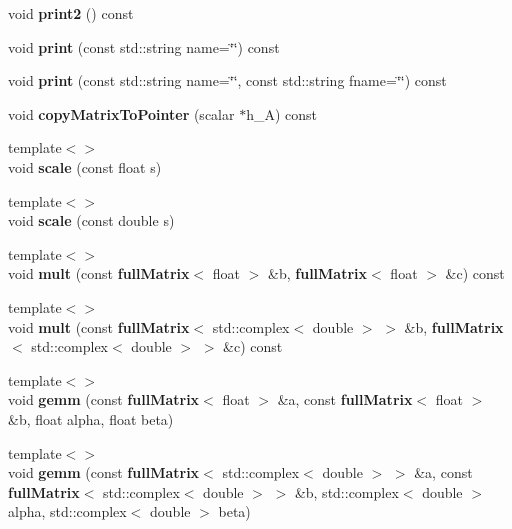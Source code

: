 \begin{DoxyCompactItemize}
\item 
void {\bfseries print2} () const \label{classfullMatrix_a62b8e0b92fa3c149fa6ba9988bcbed97}

\item 
void {\bfseries print} (const std\-::string name=\char`\"{}\char`\"{}) const \label{classfullMatrix_adfaa308571fcfa232a9a4b0c46eab453}

\item 
void {\bfseries print} (const std\-::string name=\char`\"{}\char`\"{}, const std\-::string fname=\char`\"{}\char`\"{}) const \label{classfullMatrix_a7a83c0b4db828cc61989ed7aa2c56c4c}

\item 
void {\bfseries copy\-Matrix\-To\-Pointer} (scalar $\ast$h\-\_\-\-A) const \label{classfullMatrix_a5294f88a7d8cb9cf2960257153f15776}

\item 
{\footnotesize template$<$$>$ }\\void {\bfseries scale} (const float s)\label{classfullMatrix_a29131c6c324a3f36444c0b41959b8ac9}

\item 
{\footnotesize template$<$$>$ }\\void {\bfseries scale} (const double s)\label{classfullMatrix_a263288bc530912102585b2384b3ef296}

\item 
{\footnotesize template$<$$>$ }\\void {\bfseries mult} (const {\bf full\-Matrix}$<$ float $>$ \&b, {\bf full\-Matrix}$<$ float $>$ \&c) const\label{classfullMatrix_abb98d8f13f95dc655b75c79ea19f6eaf}

\item 
{\footnotesize template$<$$>$ }\\void {\bfseries mult} (const {\bf full\-Matrix}$<$ std\-::complex$<$ double $>$ $>$ \&b, {\bf full\-Matrix}$<$ std\-::complex$<$ double $>$ $>$ \&c) const\label{classfullMatrix_afda3de318c1e48c43dc8d2d2dbaf6066}

\item 
{\footnotesize template$<$$>$ }\\void {\bfseries gemm} (const {\bf full\-Matrix}$<$ float $>$ \&a, const {\bf full\-Matrix}$<$ float $>$ \&b, float alpha, float beta)\label{classfullMatrix_a847a1302692b5b201d7560c9fae44061}

\item 
{\footnotesize template$<$$>$ }\\void {\bfseries gemm} (const {\bf full\-Matrix}$<$ std\-::complex$<$ double $>$ $>$ \&a, const {\bf full\-Matrix}$<$ std\-::complex$<$ double $>$ $>$ \&b, std\-::complex$<$ double $>$ alpha, std\-::complex$<$ double $>$ beta)\label{classfullMatrix_a3f4c5853431f1dfb6d5126a12f5be4b5}


\end{DoxyCompactItemize}
